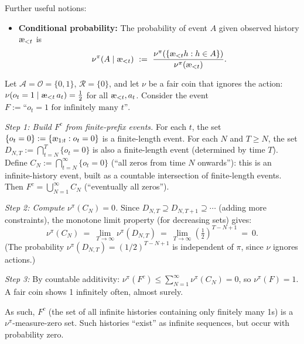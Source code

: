 \documentclass[fontsize=11pt, parskip=half]{scrartcl}
\newcommand{\cA}{\mathcal{A}}
\newcommand{\cO}{\mathcal{O}}
\newcommand{\cR}{\mathcal{R}}
\newcommand{\aes}{\textnormal{\ae}}
\begin{document}
\begin{definition}
\begin{itemize}
\end{itemize}
Further useful notions:
\begin{itemize}\itemsep=2pt
    \item \textbf{Conditional probability:} The probability of event $A$ given observed history $\aes_{<t}$ is
    \[
        \nu^\pi(A \mid \aes_{<t}) ~:=~ \frac{\nu^\pi(\{\aes_{<t} h : h \in A\})}{\nu^\pi(\aes_{<t})}.
    \]
\end{itemize}
\end{definition}

\begin{example}
Let $\cA = \cO = \{0,1\}$, $\cR = \{0\}$, and let $\nu$ be a fair coin that ignores the action: $\nu(o_t = 1 \mid \aes_{<t}\, a_t) = \tfrac{1}{2}$ for all $\aes_{<t}, a_t$.
Consider the event $F := \text{``}o_t = 1\text{ for infinitely many } t\text{''}$.

\medskip
\emph{Step 1: Build $F^c$ from finite-prefix events.}
For each $t$, the set $\{o_t = 0\} := \{\aes_{1:t} : o_t = 0\}$ is a finite-length event.
For each $N$ and $T \geq N$, the set $D_{N,T} := \bigcap_{t=N}^{T} \{o_t = 0\}$ is also a finite-length event (determined by time $T$).
Define $C_N := \bigcap_{t=N}^{\infty} \{o_t = 0\}$ (``all zeros from time $N$ onwards''): this is an infinite-history event, built as a countable intersection of finite-length events.
Then $F^c = \bigcup_{N=1}^\infty C_N$ (``eventually all zeros'').

\medskip
\emph{Step 2: Compute $\nu^\pi(C_N) = 0$.}
Since $D_{N,T} \supseteq D_{N,T+1} \supseteq \cdots$ (adding more constraints), the monotone limit property (for decreasing sets) gives:
\[
    \nu^\pi(C_N)
    ~=~ \lim_{T \to \infty} \nu^\pi(D_{N,T})
    ~=~ \lim_{T \to \infty} \left(\tfrac{1}{2}\right)^{T - N + 1}
    ~=~ 0.
\]
(The probability $\nu^\pi(D_{N,T}) = (1/2)^{T-N+1}$ is independent of $\pi$, since $\nu$ ignores actions.)

\medskip
\emph{Step 3:}
By countable additivity: $\nu^\pi(F^c) \leq \sum_{N=1}^\infty \nu^\pi(C_N) = 0$, so $\nu^\pi(F) = 1$.
A fair coin shows 1 infinitely often, almost surely.

As such, $F^c$ (the set of all infinite histories containing only finitely many 1s) is a $\nu^\pi$-measure-zero set. Such histories ``exist'' as infinite sequences, but occur with probability zero.
\end{example}
\end{document}
